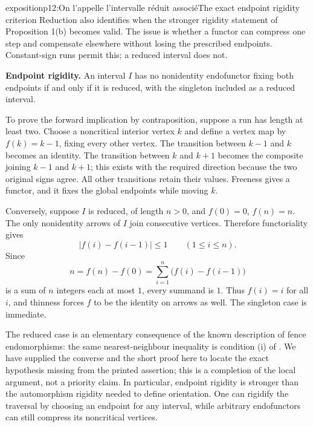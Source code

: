 \begin{dcomment}{exposition}{p12:On l'appelle l'intervalle réduit associé}{The exact endpoint rigidity criterion}
Reduction also identifies when the stronger rigidity statement of Proposition 1(b) becomes valid. The issue is whether a functor can compress one step and compensate elsewhere without losing the prescribed endpoints. Constant-sign runs permit this; a reduced interval does not.

\textbf{Endpoint rigidity.} An interval $I$ has no nonidentity endofunctor fixing both endpoints if and only if it is reduced, with the singleton included as a reduced interval.

To prove the forward implication by contraposition, suppose a run has length at least two. Choose a noncritical interior vertex $k$ and define a vertex map by $f(k)=k-1$, fixing every other vertex. The transition between $k-1$ and $k$ becomes an identity. The transition between $k$ and $k+1$ becomes the composite joining $k-1$ and $k+1$; this exists with the required direction because the two original signs agree. All other transitions retain their values. Freeness gives a functor, and it fixes the global endpoints while moving $k$.

Conversely, suppose $I$ is reduced, of length $n>0$, and $f(0)=0$, $f(n)=n$. The only nonidentity arrows of $I$ join consecutive vertices. Therefore functoriality gives
\[
|f(i)-f(i-1)|\leq1\qquad(1\leq i\leq n).
\]
Since
\[
n=f(n)-f(0)=\sum_{i=1}^n\bigl(f(i)-f(i-1)\bigr)
\]
is a sum of $n$ integers each at most $1$, every summand is $1$. Thus $f(i)=i$ for all $i$, and thinness forces $f$ to be the identity on arrows as well. The singleton case is immediate.

The reduced case is an elementary consequence of the known description of fence endomorphisms: the same nearest-neighbour inequality is condition (i) of \citet[Theorem~2.1]{FernandesKoppitzMusunthia2019}. We have supplied the converse and the short proof here to locate the exact hypothesis missing from the printed assertion; this is a completion of the local argument, not a priority claim. In particular, endpoint rigidity is stronger than the automorphism rigidity needed to define orientation. One can rigidify the traversal by choosing an endpoint for any interval, while arbitrary endofunctors can still compress its noncritical vertices.
\end{dcomment}

